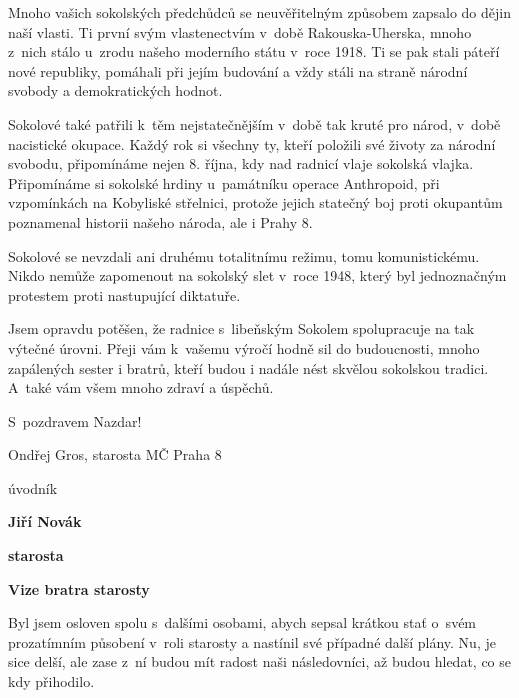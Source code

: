 \documentclass[11pt]{article}
\begin{document}
{\sloppy
Mnoho vašich sokolských předchůdců se neuvěřitelným způsobem zapsalo do dějin naší vlasti. Ti první svým vlastenectvím v~době Rakouska-Uherska, mnoho z~nich stálo u~zrodu našeho moderního státu v~roce 1918. Ti se pak stali páteří nové republiky, pomáhali při jejím budování a vždy stáli na straně národní svobody a demokratických hodnot.}

Sokolové také patřili k~těm nejstatečnějším v~době tak kruté pro národ, v~době nacistické okupace. Každý rok si všechny ty, kteří položili své životy za národní svobodu, připomínáme nejen 8. října, kdy nad radnicí vlaje sokolská vlajka. Připomínáme si sokolské hrdiny u~památníku operace Anthropoid, při vzpomínkách na Kobyliské střelnici, protože jejich statečný boj proti okupantům poznamenal historii našeho národa, ale i Prahy 8.

Sokolové se nevzdali ani druhému totalitnímu režimu, tomu komunistickému. Nikdo nemůže zapomenout na sokolský slet v~roce 1948, který byl jednoznačným protestem proti nastupující diktatuře. 

Jsem opravdu potěšen, že radnice s~libeňským Sokolem spolupracuje na tak výtečné úrovni. Přeji vám k~vašemu výročí hodně sil do budoucnosti, mnoho zapálených sester i bratrů, kteří budou i nadále nést skvělou sokolskou tradici. A~také vám všem mnoho zdraví a úspěchů. 

S~pozdravem Nazdar!

\hfill Ondřej Gros, starosta MČ Praha 8

\clearpage


\pagestyle{uvodnik}

\begin{multicols}{2}
 {\fontsize{48pt}{57pt} \fugner \color{sokolred} \noindent úvodník}

 \columnbreak

 \vspace*{-4pt}

 {\hfill\textbf{Jiří Novák}}
 
 {\hfill\textbf{starosta}}
\end{multicols}

\vspace*{12pt}
\begin{center}
  \textbf{Vize bratra starosty}
\end{center}

\noindent
Byl jsem osloven spolu s~dalšími osobami, abych sepsal krátkou stať o~svém prozatímním působení v~roli starosty a nastínil své případné další plány. Nu, je sice delší, ale zase z~ní budou mít radost naši následovníci, až budou hledat, co se kdy přihodilo.
\end{document}
